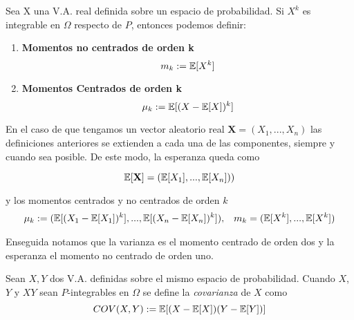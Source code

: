     
    \begin{definicion}[Momentos]
    Sea X una V.A. real definida sobre un espacio de probabilidad. Si $X^k$ es integrable en $\Omega$ respecto de $P$, entonces podemos definir:
    \begin{enumerate}
        
        \item \textbf{Momentos no centrados de orden k} \\
        \begin{equation}
            m_k := \mathbb{E} [X^k]
        \end{equation}
        
        \item \textbf{Momentos Centrados de orden k}
        \begin{equation}
            \mu_k := \mathbb{E}[(X - \mathbb{E}[X])^k]
        \end{equation}
        
    \end{enumerate}
    \end{definicion}
    
    En el caso de que tengamos un vector aleatorio real $\mathbf{X} = (X_1,...,X_n)$ las definiciones anteriores se extienden a cada una de las componentes, siempre y cuando sea posible. De este modo, la esperanza queda como 
    
    $$\mathbb{E} [\mathbf{X}] = (\mathbb{E}[X_1],...,\mathbb{E}[X_n]))$$
    
    \noindent y los momentos centrados y no centrados de orden $k$ 
    \begin{equation}
        \begin{aligned}
            \mu_{k} := (\mathbb{E}[(X_1 - \mathbb{E}[X_1])^k],...,\mathbb{E}[(X_n - \mathbb{E}[X_n])^k]), && m_{k} = (\mathbb{E}[X^k],...,\mathbb{E}[X^k]) 
        \end{aligned}
    \end{equation}  
       
       
    Enseguida notamos que la varianza es el momento centrado de orden dos y la esperanza el momento no centrado de orden uno.
    
    \begin{definicion}[Covarianza]
    
        Sean $X,Y$ dos V.A. definidas sobre el mismo espacio de probabilidad. Cuando $X$,$Y$ y $XY$ sean $P$-integrables en $\Omega$ se define la \textit{covarianza} de $X$ como 
        $$COV(X,Y) := \mathbb{E}[(X-\mathbb{E}[X])(Y - \mathbb{E}[Y])]$$
    
    \end{definicion}
    
